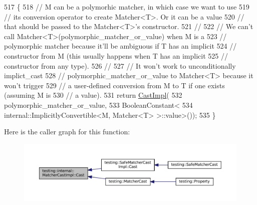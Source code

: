 \begin{DoxyCode}
517                                                                 \{
518     \textcolor{comment}{// M can be a polymorhic matcher, in which case we want to use}
519     \textcolor{comment}{// its conversion operator to create Matcher<T>.  Or it can be a value}
520     \textcolor{comment}{// that should be passed to the Matcher<T>'s constructor.}
521     \textcolor{comment}{//}
522     \textcolor{comment}{// We can't call Matcher<T>(polymorphic\_matcher\_or\_value) when M is a}
523     \textcolor{comment}{// polymorphic matcher because it'll be ambiguous if T has an implicit}
524     \textcolor{comment}{// constructor from M (this usually happens when T has an implicit}
525     \textcolor{comment}{// constructor from any type).}
526     \textcolor{comment}{//}
527     \textcolor{comment}{// It won't work to unconditionally implict\_cast}
528     \textcolor{comment}{// polymorphic\_matcher\_or\_value to Matcher<T> because it won't trigger}
529     \textcolor{comment}{// a user-defined conversion from M to T if one exists (assuming M is}
530     \textcolor{comment}{// a value).}
531     \textcolor{keywordflow}{return} \hyperlink{classtesting_1_1internal_1_1MatcherCastImpl_a378d5cc463b518803c8fddb16f12e1ab}{CastImpl}(
532         polymorphic\_matcher\_or\_value,
533         BooleanConstant<
534             internal::ImplicitlyConvertible<M, Matcher<T> >::value>());
535   \}
\end{DoxyCode}
Here is the caller graph for this function\+:
\nopagebreak
\begin{figure}[H]
\begin{center}
\leavevmode
\includegraphics[width=350pt]{classtesting_1_1internal_1_1MatcherCastImpl_a488bb69a7845f9198bbb198d8dbe41a8_icgraph}
\end{center}
\end{figure}
\mbox{\label{classtesting_1_1internal_1_1MatcherCastImpl_a378d5cc463b518803c8fddb16f12e1ab}} 
